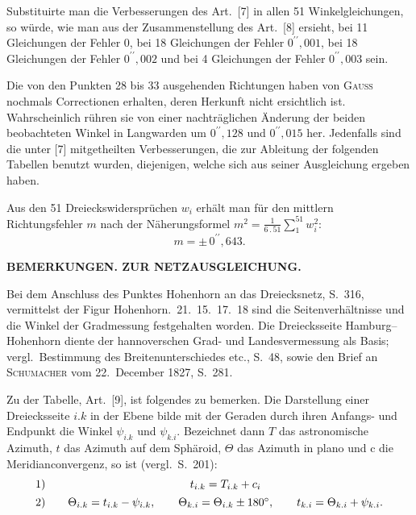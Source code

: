 \par\noindent\hspace*{\parindent}Substituirte man die Verbesserungen des Art.~[7] in allen 51 Winkelgleichungen,
so würde, wie man aus der Zusammenstellung des Art.~[8] ersieht, bei 11 Gleichungen
der Fehler $0$, bei 18 Gleichungen der Fehler $0^{\prime\prime}{,}001$,
bei 18 Gleichungen der Fehler $0^{\prime\prime}{,}002$ und bei 4 Gleichungen
der Fehler $0^{\prime\prime}{,}003$ sein.

\par\noindent\hspace*{\parindent}Die von den Punkten 28 bis 33 ausgehenden Richtungen haben von \textsc{Gauss}
nochmals Correctionen erhalten, deren Herkunft nicht ersichtlich ist.
Wahrscheinlich rühren sie von einer nachträglichen Änderung der beiden beobachteten
Winkel in Langwarden um $0^{\prime\prime}{,}128$ und $0^{\prime\prime}{,}015$ her.
Jedenfalls sind die unter [7] mitgetheilten Verbesserungen, die zur Ableitung
der folgenden Tabellen benutzt wurden, diejenigen, welche sich aus seiner Ausgleichung ergeben haben.

\par\noindent\hspace*{\parindent}Aus den 51 Dreieckswidersprüchen $w_i$ erhält man für den mittlern
Richtungsfehler $m$ nach der Näherungsformel
$\displaystyle m^2=\frac{1}{6\mathbin{.}51}\sum_{1}^{51}w_i^2$:
\[
m=\pm\,0^{\prime\prime}{,}643.
\]

\clearpage
{}\hfill\textbf{BEMERKUNGEN. ZUR NETZAUSGLEICHUNG.}
\par\medskip

\par\noindent\hspace*{\parindent}Bei dem Anschluss des Punktes Hohenhorn an das Dreiecksnetz, S.~316,
vermittelst der Figur Hohenhorn.~21.~15.~17.~18 sind die Seitenverhältnisse
und die Winkel der Gradmessung festgehalten worden. Die Dreiecksseite Hamburg--Hohenhorn
diente der hannoverschen Grad- und Landesvermessung als Basis; vergl.~Bestimmung
des Breitenunterschiedes etc., S.~48, sowie den Brief an \textsc{Schumacher}
vom 22.~December 1827, S.~281.

\par\noindent\hspace*{\parindent}Zu der Tabelle, Art.~[9], ist folgendes zu bemerken.
Die Darstellung einer Dreiecksseite $i.k$ in der Ebene bilde mit der Geraden
durch ihren Anfangs- und Endpunkt die Winkel $\psi_{i.k}$ und $\psi_{k.i}$.
Bezeichnet dann $T$ das astronomische Azimuth, $t$ das Azimuth auf dem Sphäroid,
$\Theta$ das Azimuth in plano und $\mathrm{c}$ die Meridianconvergenz,
so ist (vergl.~S.~201):
\[
\begin{array}{r@{\qquad}c}
1)&t_{i.k}=T_{i.k}+c_i\\[4pt]
2)&\Theta_{i.k}=t_{i.k}-\psi_{i.k},\qquad
\Theta_{k.i}=\Theta_{i.k}\pm180^\circ,\qquad
t_{k.i}=\Theta_{k.i}+\psi_{k.i}.
\end{array}
\]

